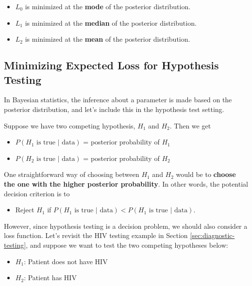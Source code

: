\documentclass[]{book}
\providecommand{\tightlist}{%
  \setlength{\itemsep}{0pt}\setlength{\parskip}{0pt}}
\theoremstyle{definition}
\theoremstyle{definition}
\theoremstyle{definition}
\theoremstyle{remark}
\begin{document}
\begin{itemize}
\tightlist
\item
  \(L_0\) is minimized at the \textbf{mode} of the posterior
  distribution.
\item
  \(L_1\) is minimized at the \textbf{median} of the posterior
  distribution.
\item
  \(L_2\) is minimized at the \textbf{mean} of the posterior
  distribution.
\end{itemize}

\subsection{Minimizing Expected Loss for Hypothesis
Testing}\label{minimizing-expected-loss-for-hypothesis-testing}

In Bayesian statistics, the inference about a parameter is made based on
the posterior distribution, and let's include this in the hypothesis
test setting.

Suppose we have two competing hypothesis, \(H_1\) and \(H_2\). Then we
get

\begin{itemize}
\tightlist
\item
  \(P(H_1 \text{ is true } | \text{ data})\) = posterior probability of
  \(H_1\)
\item
  \(P(H_2 \text{ is true } | \text{ data})\) = posterior probability of
  \(H_2\)
\end{itemize}

One straightforward way of choosing between \(H_1\) and \(H_2\) would be
to \textbf{choose the one with the higher posterior probability}. In
other words, the potential decision criterion is to

\begin{itemize}
\tightlist
\item
  Reject \(H_1\) if
  \(P(H_1 \text{ is true } | \text{ data}) < P(H_1 \text{ is true } | \text{ data})\).
\end{itemize}

However, since hypothesis testing is a decision problem, we should also
consider a loss function. Let's revisit the HIV testing example in
Section \ref{sec:diagnostic-testing}, and suppose we want to test the
two competing hypotheses below:

\begin{itemize}
\tightlist
\item
  \(H_1\): Patient does not have HIV
\item
  \(H_2\): Patient has HIV
\end{itemize}
\end{document}
